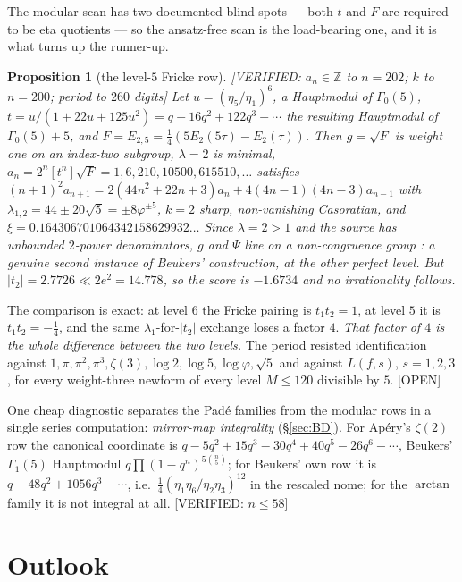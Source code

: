 \documentclass[11pt,reqno]{amsart}
\theoremstyle{plain}
\newtheorem{proposition}[theorem]{Proposition}
\theoremstyle{definition}
\theoremstyle{remark}
\theoremstyle{plain}
\newcommand{\Z}{\mathbb{Z}}
\newcommand{\VerifiedR}[1]{\textup{\textsf{[VERIFIED: #1]}}}
\newcommand{\Open}{\textup{\textsf{[OPEN]}}}
\begin{document}
The modular scan has two documented blind spots --- both $t$ and $F$ are required
to be eta quotients --- so the ansatz-free scan is the load-bearing one, and it is
what turns up the runner-up.

\begin{proposition}[the level-$5$ Fricke row]\label{prop:level5}
\VerifiedR{$a_n\in\Z$ to $n=202$; $k$ to $n=200$; period to $260$ digits}
Let $u=(\eta_5/\eta_1)^6$, a Hauptmodul of $\Gamma_0(5)$,
$t=u/(1+22u+125u^2)=q-16q^2+122q^3-\cdots$ the resulting Hauptmodul of
$\Gamma_0(5)+5$, and $F=E_{2,5}=\tfrac14(5E_2(5\tau)-E_2(\tau))$. Then
$g=\sqrt F$ is weight one on an index-two subgroup, $\lambda=2$ is minimal,
$a_n=2^n[t^n]\sqrt F=1,6,210,10500,615510,\dots$ satisfies
$(n+1)^2a_{n+1}=2(44n^2+22n+3)a_n+4(4n-1)(4n-3)a_{n-1}$ with
$\lambda_{1,2}=44\pm20\sqrt5=\pm8\varphi^{\pm5}$, $k=2$ sharp, non-vanishing
Casoratian, and $\xi=0.164306701064342158629932\ldots$ Since $\lambda=2>1$ and
the source has unbounded $2$-power denominators, $g$ and $\Psi$ live on a
non-congruence group \cite{CDT2021}: a genuine second instance of Beukers'
construction, at the other perfect level. But $|t_2|=2.7726\ll2e^2=14.778$, so
the score is $-1.6734$ and no irrationality follows.
\end{proposition}

The comparison is exact: at level $6$ the Fricke pairing is $t_1t_2=1$, at level
$5$ it is $t_1t_2=-\tfrac14$, and the same $\lambda_1$-for-$|t_2|$ exchange loses
a factor $4$. \emph{That factor of $4$ is the whole difference between the two
levels.} The period resisted identification against
$1,\pi,\pi^2,\pi^3,\zeta(3),\log2,\log5,\log\varphi,\sqrt5$ and against
$L(f,s)$, $s=1,2,3$, for every weight-three newform of every level $M\le120$
divisible by $5$. \Open{}

One cheap diagnostic separates the Pad\'e families from the modular rows in a
single series computation: \emph{mirror-map integrality} (\S\ref{sec:BD}). For
Ap\'ery's $\zeta(2)$ row the canonical coordinate is
$q-5q^2+15q^3-30q^4+40q^5-26q^6-\cdots$, Beukers' $\Gamma_1(5)$ Hauptmodul
$q\prod(1-q^n)^{5(\frac n5)}$; for Beukers' own row it is
$q-48q^2+1056q^3-\cdots$, i.e.\ $\tfrac14(\eta_1\eta_6/\eta_2\eta_3)^{12}$ in the
rescaled nome; for the $\arctan$ family it is not integral at all.
\VerifiedR{$n\le58$}

\section{Outlook}\label{sec:outlook}
\end{document}
